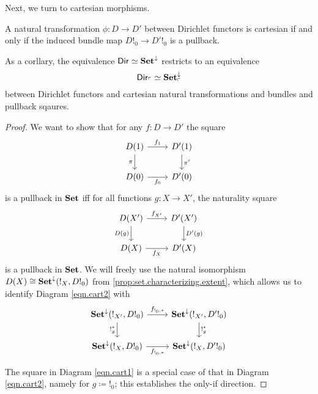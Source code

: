 Next, we turn to cartesian morphisms.
\begin{prop}
A natural transformation $\phi : D \to D'$ between Dirichlet functors is
cartesian if and only if the induced bundle map $D!_0 \to D'!_0$ is a pullback.

As a corllary, the equivalence $\operatorname{\mathsf{{Dir}}} \simeq \operatorname{\textbf{Set}}^{\mathbin{\downarrow}}$ restricts to an
equivalence
$$\operatorname{\mathsf{{Dir}}}_{\ulcorner} \simeq \operatorname{\textbf{Set}}^{\mathbin{\downarrow}}_{\ulcorner}$$
between Dirichlet functors and cartesian natural transformations and bundles and
pullback sqaures.
\end{prop}
\begin{proof}
We want to show that for any $f\colon D\to D'$ the square
\begin{equation}\label{eqn.cart1}
\begin{tikzcd}
	D(1)\ar[r, "f_1"]\ar[d, "\pi"']&
	D'(1)\ar[d, "\pi'"]\\
	D(0)\ar[r, "f_0"']&
	D'(0)
\end{tikzcd}
\end{equation}
is a pullback in $\operatorname{\textbf{Set}}$ iff for all functions $g\colon X\to X'$, the naturality square
\begin{equation}\label{eqn.cart2}
\begin{tikzcd}
  D(X')\ar[r, "f_{X'}"]\ar[d, "D(g)"']&
  D'(X')\ar[d, "D'(g)"]\\
  D(X)\ar[r, "f_X"']&
  D'(X)
\end{tikzcd}
\end{equation}
is a pullback in $\operatorname{\textbf{Set}}$. We will freely use the natural isomorphism
$D(X)\cong\operatorname{\textbf{Set}}^{\mathbin{\downarrow}}(!_X, D!_0)$ from
\ref{prop:set.characterizing.extent}, which allows us to identify Diagram
\ref{eqn.cart2} with
\begin{equation}\label{eqn.cart3}
\begin{tikzcd}
 \Set^{\down}(!_{X'}, D!_0)     \ar[r, "f_{!_0,\ast}"]\ar[d, "!_g^{\ast}"']& \Set^{\down}(!_{X'}, D'!_0)
  \ar[d, "!_{g}^{\ast}"]\\
  \Set^{\down}(!_{X}, D!_0)\ar[r, "f_{!_0, \ast}"']&
 \Set^{\down}(!_X, D'!_0) 
\end{tikzcd}
\end{equation}

The square in Diagram \ref{eqn.cart1} is a
special case of that in Diagram \ref{eqn.cart2}, namely for $g\coloneqq !_0$;
this establishes the only-if direction. 


\end{proof}
